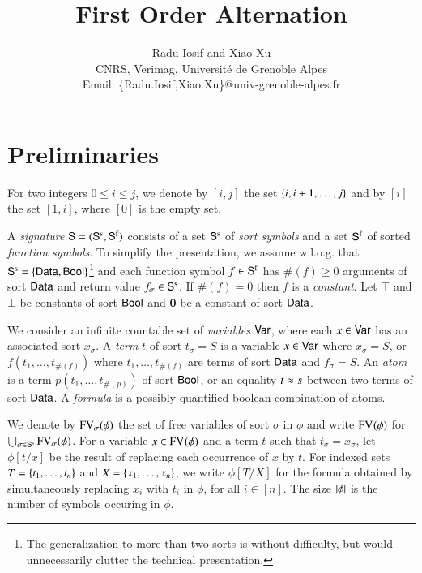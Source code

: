 \documentclass{llncs}
\begin{document}

\title{First Order Alternation}

\author{Radu Iosif and Xiao Xu \\
CNRS, Verimag, Universit\'e de Grenoble Alpes \\
Email: \{Radu.Iosif,Xiao.Xu\}@univ-grenoble-alpes.fr}

\maketitle

\begin{abstract}
\end{abstract}

\section{Preliminaries}

For two integers $0 \leq i \leq j$, we denote by $[i,j]$ the set
$\{ i,i+1,\ldots,j \}$ and by $[i]$ the set $[1,i]$, where $[0]$ is
the empty set.

A \emph{signature} $\mathsf{S} = (\mathsf{S}^\mathrm{s},\mathsf{S}^\mathrm{f})$ consists of a
set $\mathsf{S}^\mathrm{s}$ of \emph{sort symbols} and a set $\mathsf{S}^\mathrm{f}$ of
sorted \emph{function symbols}. To simplify the presentation, we
assume w.l.o.g. that $\mathsf{S}^\mathrm{s} = \{ \mathsf{Data},\mathsf{Bool} \}$\footnote{The
  generalization to more than two sorts is without difficulty, but
  would unnecessarily clutter the technical presentation.} and each
function symbol $f \in \mathsf{S}^\mathrm{f}$ has $\#(f) \geq 0$ arguments of
sort $\mathsf{Data}$ and return value $f_\sigma \in \mathsf{S}^\mathrm{s}$. If
$\#(f)=0$ then $f$ is a \emph{constant}. Let $\top$ and $\bot$ be
constants of sort $\mathsf{Bool}$ and $\mathbf{0}$ be a constant of sort
$\mathsf{Data}$. 

We consider an infinite countable set of \emph{variables} $\mathsf{Var}$,
where each $x \in \mathsf{Var}$ has an associated sort $x_\sigma$. A
\emph{term} $t$ of sort $t_\sigma = S$ is a variable $x \in \mathsf{Var}$
where $x_\sigma=S$, or $f(t_1,\ldots,t_{\#(f)})$ where
$t_1,\ldots,t_{\#(f)}$ are terms of sort $\mathsf{Data}$ and $f_\sigma=S$. An
\emph{atom} is a term $p(t_1,\ldots,t_{\#(p)})$ of sort $\mathsf{Bool}$, or an
equality $t \approx s$ between two terms of sort $\mathsf{Data}$. A
\emph{formula} is a possibly quantified boolean combination of atoms.

We denote by $\mathrm{FV}_{\sigma}(\phi)$ the set of free variables of sort
$\sigma$ in $\phi$ and write $\mathrm{FV}_{}(\phi)$ for $\bigcup_{\sigma \in
  \mathsf{S}^\mathrm{s}} \mathrm{FV}_{\sigma}(\phi)$. For a variable $x \in
\mathrm{FV}_{}(\phi)$ and a term $t$ such that $t_\sigma = x_\sigma$, let
$\phi[t/x]$ be the result of replacing each occurrence of $x$ by
$t$. For indexed sets $T=\{ t_1,\ldots,t_n \}$ and
$X=\{ x_1,\ldots,x_n \}$, we write $\phi[T/X]$ for the formula
obtained by simultaneously replacing $x_i$ with $t_i$ in $\phi$, for
all $i\in[n]$. The size ${|{\phi}|}$ is the number of symbols
occuring in $\phi$.
\end{document}
